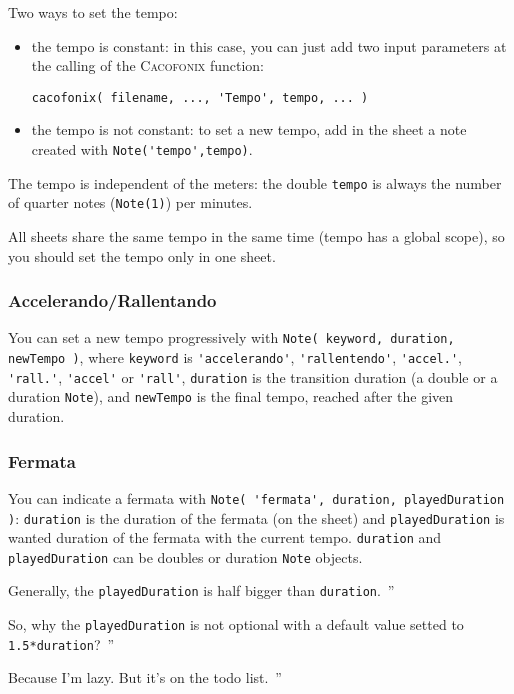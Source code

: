 \documentclass{article}
\newcommand{\cacofonix}{\textsc{Cacofonix}\xspace}
\newcommand{\note}{\lstinline!Note!\xspace}
\newenvironment{meenv}{ \par \noindent \makebox[6em][r]{ \textcolor{mecolor}{Me}: `` --~}}{~''}
\newenvironment{myselfenv}{ \par \noindent \makebox[6em][r]{ \textcolor{myselfcolor}{Myself}: `` --~}}{~''}
\newcommand{\me}[1]{\begin{meenv}#1\end{meenv}}
\newcommand{\myself}[1]{\begin{myselfenv}#1\end{myselfenv}}
\begin{document}
Two ways to set the tempo:
\begin{itemize}
  \item the tempo is constant: in this case, you can just add two input parameters at the calling of the \cacofonix function:
\begin{lstlisting}
cacofonix( filename, ..., 'Tempo', tempo, ... )
\end{lstlisting}
  \item the tempo is not constant: to set a new tempo, add in the sheet a note created with \lstinline!Note('tempo',tempo)!.
\end{itemize}

The tempo is independent of the meters: the double \lstinline!tempo! is always the number of quarter notes (\lstinline!Note(1)!) per minutes.

All sheets share the same tempo in the same time (tempo has a global scope), so you should set the tempo only in one sheet.

\subsubsection{Accelerando/Rallentando}
\label{sec:AccelerandoRallentando}

You can set a new tempo progressively with \lstinline!Note( keyword, duration, newTempo )!, where \lstinline!keyword! is \lstinline!'accelerando'!, \lstinline!'rallentendo'!, \lstinline!'accel.'!, \lstinline!'rall.'!, \lstinline!'accel'! or \lstinline!'rall'!, \lstinline!duration! is the transition duration (a double or a duration \note), and \lstinline!newTempo! is the final tempo, reached after the given duration.

\subsubsection{Fermata}
\label{sec:Fermata}

You can indicate a fermata with \lstinline!Note( 'fermata', duration, playedDuration )!: \lstinline!duration! is the duration of the fermata (on the sheet) and \lstinline!playedDuration! is wanted duration of the fermata with the current tempo. \lstinline!duration! and \lstinline!playedDuration! can be doubles or duration \note objects.

\myself{Generally, the \lstinline!playedDuration! is half bigger than \lstinline!duration!.}
\me{So, why the \lstinline!playedDuration! is not optional with a default value setted to \lstinline!1.5*duration!?}
\myself{Because I'm lazy. But it's on the todo list.}
\end{document}
